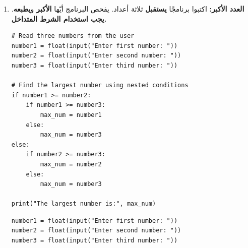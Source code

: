 \documentclass[14pt]{extarticle}
\begin{document}
\begin{enumerate}[resume, label=\textbf{تمرين \arabic*:}, wide=0pt, itemsep=2.2em]
\begin{boxSolution}
\begin{english}
\begin{verbatim}
if number > 0 and number <= 9:
    print(number, "is a single digit number.")
else:
    print(number, "is not a single digit number.")
\end{verbatim}
\end{english}
\end{boxSolution}

\filbreak

\begin{boxSolution}[التحدي]
\begin{english}
\begin{verbatim}
number = int(input("Enter a number: "))

if number >= -9:
    if number <= 9:
        print(number, "is a single digit number.")
    else:
        print(number, "is not a single digit number.")
else:
    print(number, "is not a single digit number.")
\end{verbatim}
\end{english}
\end{boxSolution}

\fi
\filbreak

\item \textbf{العدد الأكبر:} اكتبوا برنامجًا \textbf{يستقبل} ثلاثة أعداد. يفحص البرنامج أيّها \textbf{الأكبر} و\textbf{يطبعه}. \textbf{يجب استخدام الشرط المتداخل.}

\ifwithsols
\begin{boxSolution}[1]
\begin{english}
\begin{verbatim}
# Read three numbers from the user
number1 = float(input("Enter first number: "))
number2 = float(input("Enter second number: "))
number3 = float(input("Enter third number: "))

# Find the largest number using nested conditions
if number1 >= number2:
    if number1 >= number3:
        max_num = number1
    else:
        max_num = number3
else:
    if number2 >= number3:
        max_num = number2
    else:
        max_num = number3

print("The largest number is:", max_num)
\end{verbatim}
\end{english}
\end{boxSolution}

\filbreak

\begin{boxSolution}
\begin{english}
\begin{verbatim}
number1 = float(input("Enter first number: "))
number2 = float(input("Enter second number: "))
number3 = float(input("Enter third number: "))


\end{verbatim}
\end{english}
\end{boxSolution}
\end{enumerate}
\end{document}
